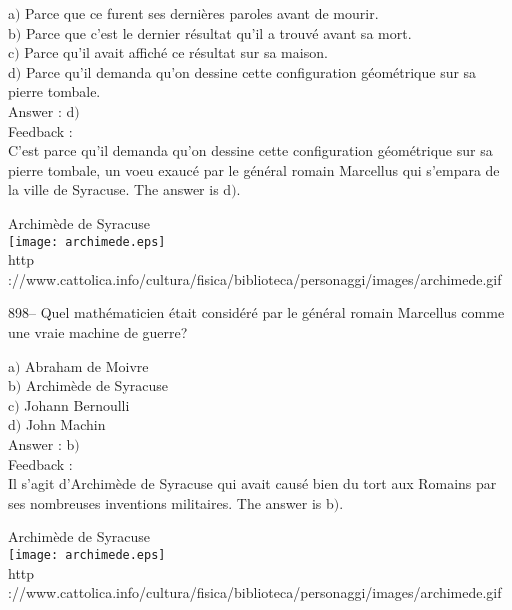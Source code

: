 ﻿\documentclass[letterpaper, 12pt]{article}
\begin{document}
a$)$ Parce que ce furent ses derni\`eres paroles avant de mourir. \\
b$)$ Parce que c'est le dernier r\'esultat qu'il a trouv\'e avant sa mort.
\\
c$)$ Parce qu'il avait affich\'e ce r\'esultat sur sa maison. \\
d$)$ Parce qu'il demanda qu'on dessine cette configuration g\'eom\'etrique
sur sa pierre tombale.\\

Answer : d$)$\\

Feedback : \\
C'est parce qu'il demanda qu'on dessine cette configuration g\'eom\'etrique
sur sa pierre tombale,
un voeu exauc\'e par le g\'en\'eral romain Marcellus qui s'empara de la
ville de Syracuse. The answer is d$)$.\\

        \begin{center}
        Archim\`ede de Syracuse\\
    \texttt{[image: archimede.eps]}\\
        {\footnotesize http
://www.cattolica.info/cultura/fisica/biblioteca/personaggi/images/archimede.gif}
    \end{center}

898-- Quel math\'ematicien \'etait consid\'er\'e par le g\'en\'eral
romain Marcellus comme une vraie machine de guerre?

a$)$ Abraham de Moivre \\
b$)$ Archim\`ede de Syracuse \\
c$)$ Johann Bernoulli \\
d$)$ John Machin \\

Answer : b$)$\\

Feedback :\\
Il s'agit d'Archim\`ede de Syracuse qui avait caus\'e bien du tort
aux Romains par ses nombreuses inventions
militaires. The answer is b$)$.\\

        \begin{center}
        Archim\`ede de Syracuse\\
    \texttt{[image: archimede.eps]}\\
        {\footnotesize http
://www.cattolica.info/cultura/fisica/biblioteca/personaggi/images/archimede.gif}
    \end{center}
\end{document}
